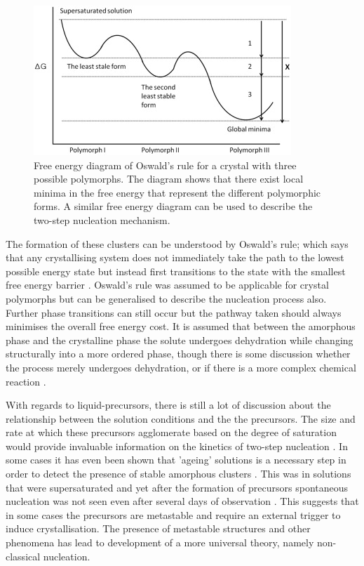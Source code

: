 \begin{figure}
	\centering
	\includegraphics[width=\linewidth]{oswalds_rule.jpg}
	\caption{Free energy diagram of Oswald's rule for a 
	crystal with three possible polymorphs. The diagram 
	shows that there exist local minima in the free energy 
	that represent the different polymorphic forms. A similar
	free energy diagram can be used to describe the two-step
	nucleation mechanism.}
\end{figure}

The formation of these clusters can be understood by Oswald's 
rule; which says that any crystallising system does not 
immediately take the path to the lowest possible energy state 
but instead first transitions to the state with the smallest 
free energy barrier \cite{Ostwald1897}. Oswald's rule was 
assumed to be applicable for crystal polymorphs but can be
generalised to describe the nucleation process also. Further phase 
transitions can still occur but the pathway taken should 
always minimises the overall free energy cost. It is assumed
that between the amorphous phase and the crystalline phase 
the solute undergoes dehydration while changing structurally 
into a more ordered phase, though there is some discussion 
whether the process merely undergoes dehydration, or if there 
is a more complex chemical reaction
\cite{Karthika2016}.

With regards to liquid-precursors, there is still a lot of
discussion about the relationship between the solution 
conditions and the the precursors. The size and rate at 
which these precursors agglomerate based on the degree of 
saturation would provide invaluable information on the 
kinetics of two-step nucleation \cite{Fu2021}. In some 
cases it has even been shown that 'ageing' solutions is 
a necessary step in order to detect the presence of 
stable amorphous clusters \cite{Liao2022}. This was in 
solutions that were supersaturated and yet after the 
formation of precursors spontaneous nucleation was not
seen even after several days of observation \cite{Liao2022}.
This suggests that in some cases the precursors are
metastable and require an external trigger to induce
crystallisation. The presence of metastable structures
and other phenomena has lead to development of a more 
universal theory, namely non-classical nucleation.

